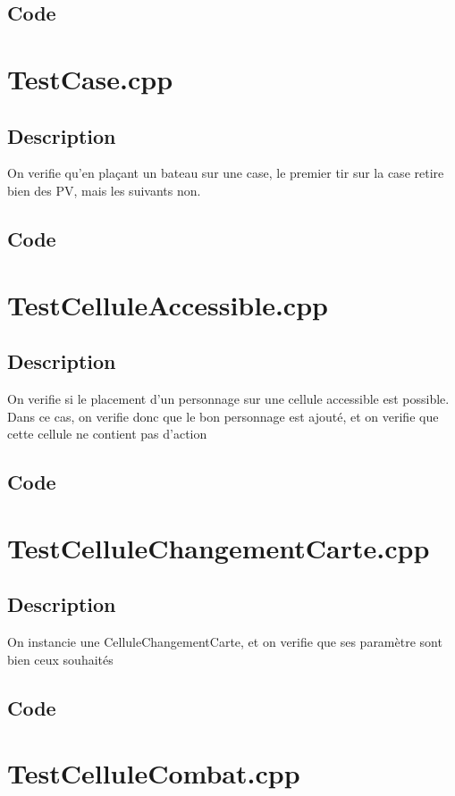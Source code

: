         \subsection{Code}
    \section{TestCase.cpp}
        \subsection{Description}
            On verifie qu'en plaçant un bateau sur une case, le premier tir sur la case retire bien des PV, mais les suivants non.
        \subsection{Code}
    \section{TestCelluleAccessible.cpp}
        \subsection{Description}
            On verifie si le placement d'un personnage sur une cellule accessible est possible.\\
            Dans ce cas, on verifie donc que le bon personnage est ajouté, et on verifie que cette cellule ne contient pas d'action
        \subsection{Code}
    \section{TestCelluleChangementCarte.cpp}
        \subsection{Description}
            On instancie une CelluleChangementCarte, et on verifie que ses paramètre sont bien ceux souhaités
        \subsection{Code}
    \section{TestCelluleCombat.cpp}
